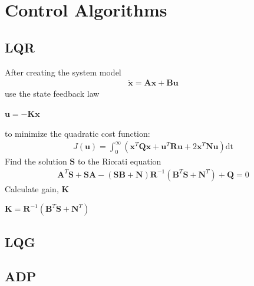\chapter{Control Algorithms}

\section{LQR}

    After creating the system model
    \begin{align*}
        \dot{\mathbf{x}} = \mathbf{A}\mathbf{x} + \mathbf{B}\mathbf{u}
    \end{align*}
    use the state feedback law
    \begin{center}
        $\mathbf{u} = -\mathbf{K}\mathbf{x}$
    \end{center}
    to minimize the quadratic cost function:
    \begin{align*}
        J(\mathbf{u}) = \int_0^\infty (\mathbf{x}^T\mathbf{Q}\mathbf{x} + \mathbf{u}^T\mathbf{R}\mathbf{u} + 2\mathbf{x}^T\mathbf{N}\mathbf{u})\mathrm{dt}
    \end{align*}
    Find the solution $\mathbf{S}$ to the Riccati equation
    \begin{align*}
        \mathbf{A}^T\mathbf{S}+\mathbf{SA}-(\mathbf{SB}+\mathbf{N})\mathbf{R}^{-1}(\mathbf{B}^T\mathbf{S}+\mathbf{N}^T)+\mathbf{Q}=0
    \end{align*}    
    Calculate gain, $\mathbf{K}$
    \begin{center}
        $\mathbf{K}=\mathbf{R}^{-1}(\mathbf{B}^T\mathbf{S}+\mathbf{N}^T)$
    \end{center}

\section{LQG}

\section{ADP}

